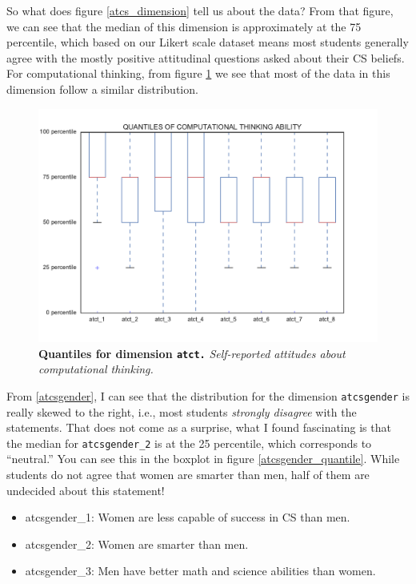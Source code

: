 So what does figure \ref{atcs_dimension} tell us about the data? From that figure, we can see that the median of this dimension is approximately at the 75 percentile, which based on our Likert scale dataset means most students generally agree with the mostly positive attitudinal questions asked about their CS beliefs. For computational thinking, from figure \ref{atct_dimension} we see that most of the data in this dimension follow a similar distribution.
\begin{figure}[!hbtp]
\centering
    \caption{\textbf{Quantiles for dimension \texttt{atct.} }\textit{Self-reported attitudes about computational thinking.}}\label{atct_dimension}
    \includegraphics[width=1\textwidth]{figures/atct_quantile}
\end{figure}

From \ref{atcsgender}, I can see that the distribution for the dimension \texttt{atcsgender} is really skewed to the right, i.e., most students \emph{strongly disagree} with the statements. That does not come as a surprise, what I found fascinating is that the median for \texttt{atcsgender\_2} is at the 25 percentile, which corresponds to ``neutral.'' You can see this in the boxplot in figure \ref{atcsgender_quantile}.  While students do not agree that women are smarter than men, half of them are undecided about this statement!
\begin {itemize}
\item atcsgender\_1: Women are less capable of success in CS than men.
\item atcsgender\_2: Women are smarter than men.
\item atcsgender\_3: Men have better math and science abilities than women.
\end{itemize} 

